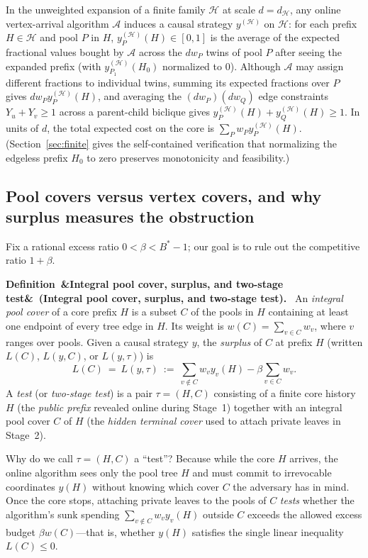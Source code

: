 \documentclass[11pt,letterpaper]{article}
\newenvironment{definition}[1][]{\refstepcounter{lemma}\par\medskip\noindent\textbf{Definition~\thelemma\ifx&#1&\else\ (#1)\fi.}\ \ignorespaces}{\par\medskip}
\begin{document}
In the unweighted expansion of a finite family $\mathcal H$ at scale $d=d_{\mathcal H}$, any online vertex-arrival algorithm $\mathcal A$ induces a causal strategy $y^{(\mathcal H)}$ on $\mathcal H$: for each prefix $H\in\mathcal H$ and pool $P$ in $H$, $y_P^{(\mathcal H)}(H)\in[0,1]$ is the average of the expected fractional values bought by $\mathcal A$ across the $d w_P$ twins of pool $P$ after seeing the expanded prefix (with $y_{P_1}^{(\mathcal H)}(H_0)$ normalized to $0$). Although $\mathcal A$ may assign different fractions to individual twins, summing its expected fractions over $P$ gives $d w_P y_P^{(\mathcal H)}(H)$, and averaging the $(d w_P)(d w_Q)$ edge constraints $Y_u+Y_v\ge 1$ across a parent-child biclique gives $y_P^{(\mathcal H)}(H)+y_Q^{(\mathcal H)}(H)\ge 1$. In units of $d$, the total expected cost on the core is $\sum_P w_P y_P^{(\mathcal H)}(H)$. (Section~\ref{sec:finite} gives the self-contained verification that normalizing the edgeless prefix $H_0$ to zero preserves monotonicity and feasibility.)

\subsection{Pool covers versus vertex covers, and why surplus measures the obstruction}

Fix a rational excess ratio $0<\beta<B^*-1$; our goal is to rule out the competitive ratio $1+\beta$.

\begin{definition}[Integral pool cover, surplus, and two-stage test]\label{def:surplus}
An \emph{integral pool cover} of a core prefix $H$ is a subset $C$ of the pools in $H$ containing at least one endpoint of every tree edge in $H$. Its weight is $w(C)=\sum_{v\in C} w_v$, where $v$ ranges over pools. Given a causal strategy $y$, the \emph{surplus} of $C$ at prefix $H$ (written $L(C)$, $L(y,C)$, or $L(y,\tau)$) is
\[
  L(C)\ =\ L(y,\tau)\ :=\ \sum_{v\notin C}w_v y_v(H) - \beta\sum_{v\in C}w_v .
\]
A \emph{test} (or \emph{two-stage test}) is a pair $\tau=(H,C)$ consisting of a finite core history $H$ (the \emph{public prefix} revealed online during Stage~1) together with an integral pool cover $C$ of $H$ (the \emph{hidden terminal cover} used to attach private leaves in Stage~2).
\end{definition}

Why do we call $\tau=(H,C)$ a ``test''? Because while the core $H$ arrives, the online algorithm sees only the pool tree $H$ and must commit to irrevocable coordinates $y(H)$ without knowing which cover $C$ the adversary has in mind. Once the core stops, attaching private leaves to the pools of $C$ \emph{tests} whether the algorithm's sunk spending $\sum_{v\notin C} w_v y_v(H)$ outside $C$ exceeds the allowed excess budget $\beta w(C)$---that is, whether $y(H)$ satisfies the single linear inequality $L(C)\le 0$.
\end{document}
